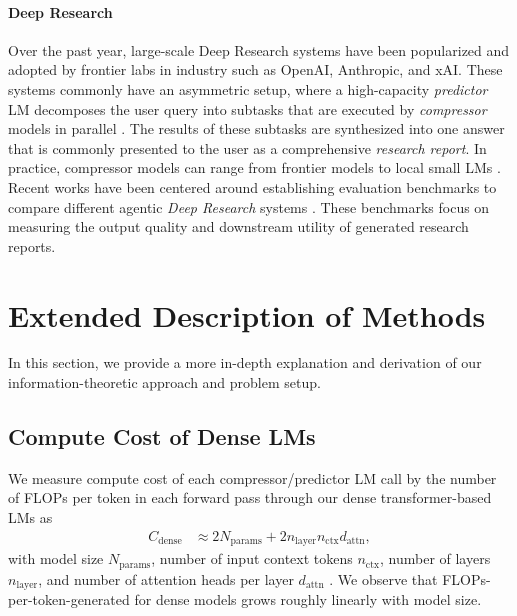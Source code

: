 \documentclass{article} %
\begin{document}
\paragraph*{Deep Research} Over the past year, large-scale Deep Research systems have been popularized and adopted by frontier labs in industry such as OpenAI, Anthropic, and xAI. These systems commonly have an asymmetric setup, where a high-capacity \textit{predictor} LM decomposes the user query into subtasks that are executed by \textit{compressor} models in parallel \citep{schluntz2025building}. The results of these subtasks are synthesized into one answer that is commonly presented to the user as a comprehensive \textit{research report}. In practice, compressor models can range from frontier models \citep{hadfield2025multiagent, schluntz2025building} to local small LMs \citep{narayan2025minions}. Recent works have been centered around establishing evaluation benchmarks to compare different agentic \textit{Deep Research} systems \citep{du2025deepresearch, guha2023legalbench, nakano2021webgpt}. These benchmarks focus on measuring the output quality and downstream utility of generated research reports. 

\section{Extended Description of Methods}
\label{appendix-methods}

In this section, we provide a more in-depth explanation and derivation of our information-theoretic approach and problem setup.

\subsection{Compute Cost of Dense LMs}
\label{sec:appendix-compute-cost}
We measure compute cost of each compressor/predictor LM call by the number of FLOPs per token in each forward pass through our dense transformer-based LMs as
\begin{align*}
    C_{\mathrm{dense}} &\approx 2N_{\mathrm{params}} + 2n_{\mathrm{layer}}n_{\mathrm{ctx}}d_{\mathrm{attn}},
\end{align*}
with model size \(N_{\mathrm{params}}\), number of input context tokens \(n_{\mathrm{ctx}}\), number of layers \(n_{\mathrm{layer}}\), and number of attention heads per layer \(d_{\mathrm{attn}}\) \citep{scalinglaws}. We observe that FLOPs-per-token-generated for dense models grows roughly linearly with model size.
\end{document}
